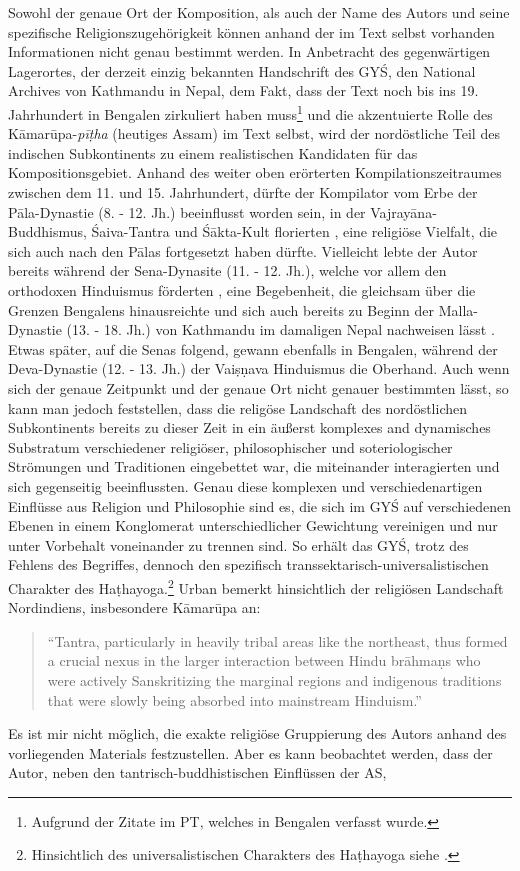 \documentclass[a4paper,12pt]{article}
\begin{document}
{    Sowohl der genaue Ort der Komposition, als auch der Name des Autors und seine spezifische Religionszugehörigkeit können anhand der im Text selbst vorhanden Informationen nicht genau bestimmt werden. In Anbetracht des gegenwärtigen Lagerortes, der derzeit einzig bekannten Handschrift des GYŚ, den National Archives von Kathmandu in Nepal, dem Fakt, dass der Text noch bis ins 19. Jahrhundert in Bengalen zirkuliert haben muss\footnote{Aufgrund der Zitate im PT, welches in Bengalen verfasst wurde.} und die akzentuierte Rolle des Kāmarūpa-\textit{pīṭha} (heutiges Assam) im Text selbst, wird der nordöstliche Teil des indischen Subkontinents zu einem realistischen Kandidaten für das Kompositionsgebiet. Anhand des weiter oben erörterten Kompilationszeitraumes zwischen dem 11. und 15. Jahrhundert, dürfte der Kompilator vom Erbe der Pāla-Dynastie (8. - 12. Jh.) beeinflusst worden sein, in der Vajrayāna-Buddhismus, Śaiva-Tantra und Śākta-Kult florierten \parencite[218]{majumdar1977}, eine religiöse Vielfalt, die sich auch nach den Pālas fortgesetzt haben dürfte. Vielleicht lebte der Autor bereits während der Sena-Dynasite (11. - 12. Jh.), welche vor allem den orthodoxen Hinduismus förderten \parencite[312]{majumdar1977}, eine Begebenheit, die gleichsam über die Grenzen Bengalens hinausreichte und sich auch bereits zu Beginn der Malla-Dynastie (13. - 18. Jh.) von Kathmandu im damaligen Nepal nachweisen lässt \parencite[243]{gellner1997}. Etwas später, auf die Senas folgend, gewann ebenfalls in Bengalen, während der Deva-Dynastie (12. - 13. Jh.) der Vaiṣṇava Hinduismus \parencite[253-254]{majumdar1961x} die Oberhand. Auch wenn sich der genaue Zeitpunkt und der genaue Ort nicht genauer bestimmten lässt, so kann man jedoch feststellen, dass die religöse Landschaft des nordöstlichen Subkontinents bereits zu dieser Zeit in ein äußerst komplexes and dynamisches Substratum verschiedener religiöser, philosophischer und soteriologischer Strömungen und Traditionen eingebettet war, die miteinander interagierten und sich gegenseitig beeinflussten. Genau diese komplexen und verschiedenartigen Einflüsse aus Religion und Philosophie sind es, die sich im GYŚ auf verschiedenen Ebenen in einem Konglomerat unterschiedlicher Gewichtung vereinigen und nur unter Vorbehalt voneinander zu trennen sind. So erhält das GYŚ, trotz des Fehlens des Begriffes, dennoch den spezifisch transsektarisch-universalistischen Charakter des Haṭhayoga.\footnote{Hinsichtlich des universalistischen Charakters des Haṭhayoga siehe \parencite[229-231]{mallinson2014b}.} Urban bemerkt hinsichtlich der religiösen Landschaft Nordindiens, insbesondere Kāmarūpa an: \begin{quote} ``Tantra, particularly in heavily tribal areas like the northeast, thus formed a crucial nexus in the larger interaction between Hindu brāhmaṇs who were actively Sanskritizing the marginal regions and indigenous traditions that were slowly being absorbed into mainstream Hinduism.'' \parencite[44]{urban2010}\end{quote} Es ist mir nicht möglich, die exakte religiöse Gruppierung des Autors anhand des vorliegenden Materials festzustellen. Aber es kann beobachtet werden, dass der Autor, neben den tantrisch-buddhistischen Einflüssen der AS, }
\end{document}
